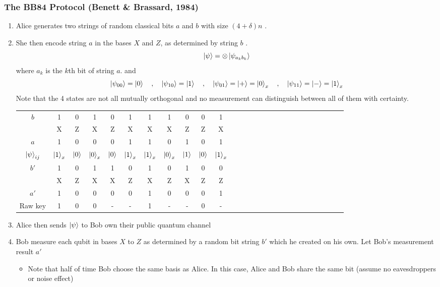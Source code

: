 \documentclass[]{book}
\theoremstyle{nonumberplain}
\begin{document}
\subsubsection{The BB84 Protocol (Benett \& Brassard, 1984)}
\begin{enumerate}
    \item Alice generates two strings of random classical bits $a$ and $b$ with size $(4+\delta)n$ .
    \item She then encode string $a$ in the bases $X$ and $Z$, as determined by string $b$ .\\
    $$
    \ket{\psi}=\otimes\ket{\psi_{a_{k}b_{k}}}$$
    where $a_{k}$ is the $k$th bit of string $a$. and
    $$
    \ket{\psi_{00}}= \ket{0}\quad, \quad\ket{\psi_{10}}= \ket{1}\quad, \quad\ket{\psi_{01}}= \ket{+}=\ket{0}_{x}\quad, \quad\ket{\psi_{11}}= \ket{-} = \ket{1}_{x}
    $$
    Note that the 4 states are not all mutually orthogonal and no measurement can distinguish between all of them with certainty. 
\begin{table}[!h]
    \centering
    \renewcommand{\arraystretch}{1.2}
\begin{tabular}{c|cccccccccccccccccccccccccc}
    \hline
    \multirow{2}{*}{$b$} &1&0&1&0&1&1&1&0&0&1\\
       &X&Z&X&Z&X&X&X&Z&Z&X\\
    $a$   &1&0&0&0&1&1&0&1&0&1\\
    $\ket{\psi}_{ij}$ &$\ket{1}_{x}$&$\ket{0}$&$\ket{0}_{x}$&$\ket{0}$&$\ket{1}_{x}$&$\ket{1}_{x}$&$\ket{0}_{x}$&$\ket{1}$&$\ket{0}$&$\ket{1}_{x}$\\ 
    \hline
    \multirow{2}{*}{$b'$}& 1&0&1&1&0&1&0&1&0&0 \\
     & X&Z&X&X&Z&X&Z&X&Z&Z \\
    $a'$ & 1&0&0&0&0&1&0&0&0&1 \\
    Raw key & 1&0&0&-&-&1&-&-&0&- \\ \hline
\end{tabular}
\end{table}
    \item Alice then sends $\ket{\psi}$ to Bob own their public quantum channel
    \item Bob measure each qubit in bases $X$ to $Z$ as determined by a random bit string $b'$ which he created on his own. Let Bob's measurement result $a'$
    \begin{itemize}
        \item Note that half of time Bob choose the same basis as Alice. In this case, Alice and Bob share the same bit (assume no eavesdroppers or noise effect)

\end{itemize}
\end{enumerate}
\end{document}
